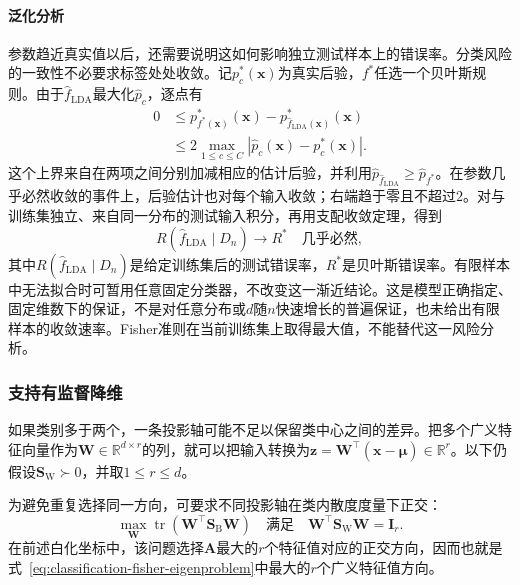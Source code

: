 \paragraph{泛化分析}
参数趋近真实值以后，还需要说明这如何影响独立测试样本上的错误率。分类风险的一致性不必要求标签处处收敛。记$p_c^\ast(\bm{x})$为真实后验，$f^\ast$任选一个贝叶斯规则。由于$\hat f_{\mathrm{LDA}}$最大化$\hat p_c$，逐点有
\begin{equation}
  \label{eq:classification-lda-excess-risk}
  \begin{aligned}
    0&\leq p_{f^\ast(\bm{x})}^\ast(\bm{x})
      -p_{\hat f_{\mathrm{LDA}}(\bm{x})}^\ast(\bm{x})\\
      &\leq 2\max_{1\leq c\leq C}
          |\hat p_c(\bm{x})-p_c^\ast(\bm{x})| .
  \end{aligned}
\end{equation}
这个上界来自在两项之间分别加减相应的估计后验，并利用$\hat p_{\hat f_{\mathrm{LDA}}}\geq\hat p_{f^\ast}$。在参数几乎必然收敛的事件上，后验估计也对每个输入收敛；右端趋于零且不超过$2$。对与训练集独立、来自同一分布的测试输入积分，再用支配收敛定理，得到
\[
  R(\hat f_{\mathrm{LDA}}\mid D_n)
    \longrightarrow R^\ast
    \quad\text{几乎必然},
\]
其中$R(\hat f_{\mathrm{LDA}}\mid D_n)$是给定训练集后的测试错误率，$R^\ast$是贝叶斯错误率。有限样本中无法拟合时可暂用任意固定分类器，不改变这一渐近结论。这是模型正确指定、固定维数下的保证，不是对任意分布或$d$随$n$快速增长的普遍保证，也未给出有限样本的收敛速率。Fisher准则在当前训练集上取得最大值，不能替代这一风险分析。

\subsubsection{支持有监督降维}
\label{sec:classification-lda-reduction}

如果类别多于两个，一条投影轴可能不足以保留类中心之间的差异。把多个广义特征向量作为$\bm{W}\in\mathbb{R}^{d\times r}$的列，就可以把输入转换为$\bm{z}=\bm{W}^{\top}(\bm{x}-\hat{\bm{\mu}})\in\mathbb{R}^{r}$。以下仍假设$\bm{S}_{\mathrm{W}}\succ0$，并取$1\leq r\leq d$。

为避免重复选择同一方向，可要求不同投影轴在类内散度度量下正交：
\begin{equation}
  \label{eq:classification-lda-subspace}
  \max_{\bm{W}}\operatorname{tr}
       (\bm{W}^{\top}\bm{S}_{\mathrm{B}}\bm{W})
  \quad\text{满足}\quad
  \bm{W}^{\top}\bm{S}_{\mathrm{W}}\bm{W}=\bm{I}_r .
\end{equation}
在前述白化坐标中，该问题选择$\bm{A}$最大的$r$个特征值对应的正交方向，因而也就是式~\eqref{eq:classification-fisher-eigenproblem}中最大的$r$个广义特征值方向。

